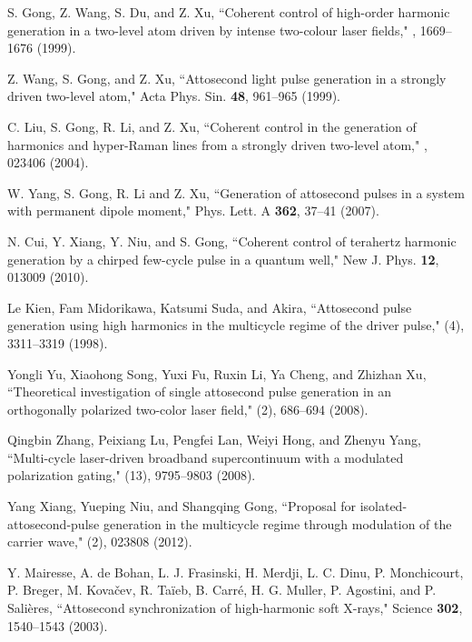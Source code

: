 \documentclass[10pt,letterpaper]{article}
\begin{document}
\begin{thebibliography}{99}
S. Gong, Z. Wang, S. Du, and Z. Xu, ``Coherent control of high-order harmonic generation in a two-level atom driven by intense two-colour laser fields," , 1669--1676 (1999).

Z. Wang, S. Gong, and Z. Xu, ``Attosecond light pulse generation in a strongly driven two-level atom," Acta Phys. Sin. {\bf 48}, 961--965 (1999).

C. Liu, S. Gong, R. Li, and Z. Xu, ``Coherent control in the generation of harmonics and hyper-Raman lines from a strongly driven two-level atom," , 023406 (2004).

W. Yang, S. Gong, R. Li and Z. Xu, ``Generation of attosecond pulses in a system with permanent dipole moment," Phys. Lett. A {\bf 362}, 37--41 (2007).

N. Cui, Y. Xiang, Y. Niu, and S. Gong, ``Coherent control of terahertz harmonic generation by a chirped few-cycle pulse in a quantum well," New J. Phys. {\bf 12}, 013009 (2010).

Le Kien, Fam Midorikawa, Katsumi Suda, and Akira, ``Attosecond pulse generation using high harmonics in the multicycle regime of the driver pulse," (4), 3311--3319 (1998).

Yongli Yu, Xiaohong Song, Yuxi Fu, Ruxin Li, Ya Cheng, and Zhizhan Xu, ``Theoretical investigation of single attosecond pulse generation in an orthogonally polarized two-color laser field," (2), 686--694 (2008).

Qingbin Zhang, Peixiang Lu, Pengfei Lan, Weiyi Hong, and Zhenyu Yang, ``Multi-cycle laser-driven broadband supercontinuum with a modulated polarization gating," (13), 9795--9803 (2008).

Yang Xiang, Yueping Niu, and Shangqing Gong, ``Proposal for isolated-attosecond-pulse generation in the multicycle regime through modulation of the carrier wave," (2), 023808 (2012).

Y. Mairesse, A. de Bohan, L. J. Frasinski, H. Merdji, L. C. Dinu, P. Monchicourt, P. Breger, M. Kova\v{c}ev, R. Ta\"{i}eb, B. Carr\'{e}, H. G. Muller, P. Agostini, and P. Sali\`{e}res,  ``Attosecond synchronization of high-harmonic soft X-rays," Science {\bf 302}, 1540--1543 (2003).


\end{thebibliography}
\end{document}
